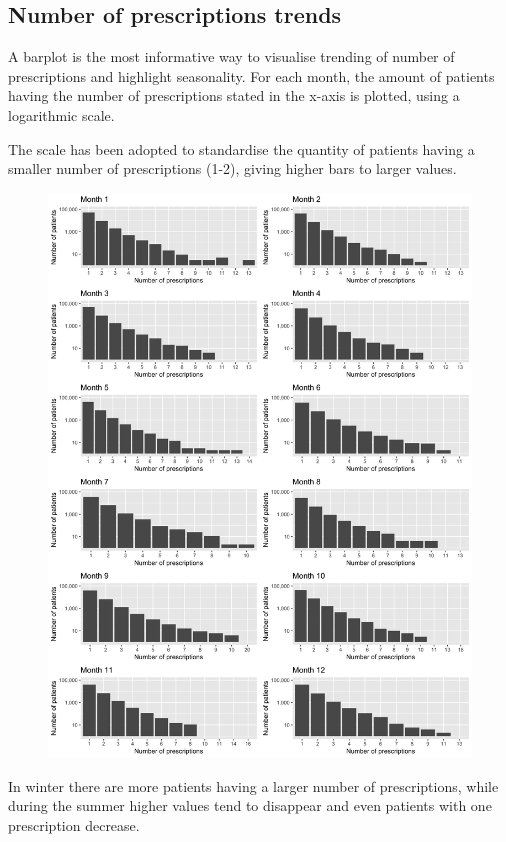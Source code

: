 \subsection{Number of prescriptions trends}
A barplot is the most informative way to visualise trending of number of prescriptions and highlight seasonality. For each month, the amount of patients having the number of prescriptions stated in the x-axis is plotted, using a logarithmic scale.

The scale has been adopted to standardise the quantity of patients having a smaller number of prescriptions (1-2), giving higher bars to larger values.

\begin{figure}[h]
	\centering
	\includegraphics[scale=0.135]{../plots/prescriptions_number-month.png}
\end{figure}

In winter there are more patients having a larger number of prescriptions, while during the summer higher values tend to disappear and even patients with one prescription decrease.

